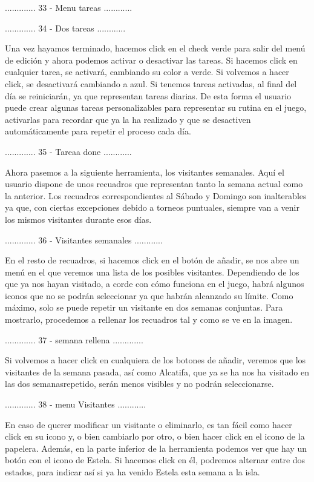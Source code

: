 ............. 33 - Menu tareas ............

............. 34 - Dos tareas ............

Una vez hayamos terminado, hacemos click en el check verde para salir del menú de edición y
ahora podemos activar o desactivar las tareas. Si hacemos click en cualquier tarea, se activará,
cambiando su color a verde. Si volvemos a hacer click, se desactivará cambiando a azul. Si tenemos
tareas activadas, al final del día se reiniciarán, ya que representan tareas diarias. De esta forma
el usuario puede crear algunas tareas personalizables para representar su rutina en el juego,
activarlas para recordar que ya la ha realizado y que se desactiven automáticamente para repetir
el proceso cada día.

............. 35 - Tareaa done ............


Ahora pasemos a la siguiente herramienta, los visitantes semanales. Aquí el usuario dispone de
unos recuadros que representan tanto la semana actual como la anterior. Los recuadros correspondientes
al Sábado y Domingo son inalterables ya que, con ciertas excepciones debido a torneos puntuales,
siempre van a venir los mismos visitantes durante esos días.

............. 36 - Visitantes semanales ............

En el resto de recuadros, si hacemos click en el botón de añadir, se nos abre un menú en el que
veremos una lista de los posibles visitantes. Dependiendo de los que ya nos hayan visitado, a corde
con cómo funciona en el juego, habrá algunos iconos que no se podrán seleccionar ya que habrán alcanzado
su límite. Como máximo, solo se puede repetir un visitante en dos semanas conjuntas. Para mostrarlo, 
procedemos a rellenar los recuadros tal y como se ve en la imagen.

............. 37 - semana rellena ............. 

Si volvemos a hacer click en cualquiera de los botones de añadir, veremos que los visitantes
de la semana pasada, así como Alcatifa, que ya se ha nos ha visitado en las dos semanasrepetido, 
serán menos visibles y no podrán seleccionarse.

............. 38 - menu Visitantes ............

En caso de querer modificar un visitante o eliminarlo, es tan fácil como hacer click en su icono y, o
bien cambiarlo por otro, o bien hacer click en el icono de la papelera. Además, en la parte inferior
de la herramienta podemos ver que hay un botón con el icono de Estela. Si hacemos click en él, podremos
alternar entre dos estados, para indicar así si ya ha venido Estela esta semana a la isla.

